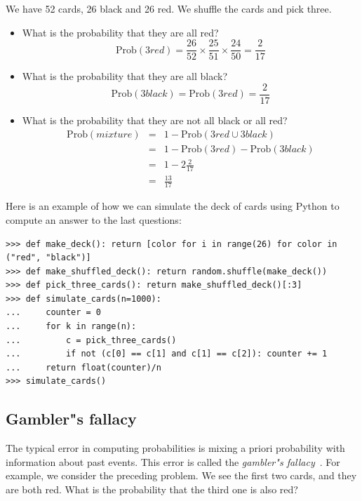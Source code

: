 \documentclass[justified, sixbynine]{tufte-book}
\def\ft{\small\tt}
\theoremstyle{plain}%
\newtheorem * {corollary}{Corollary}
\theoremstyle{definition}
\theoremstyle{remark}
\newtheorem * {remark}{Remark}
\newtheorem * {note}{Note}
\begin{document}
\begin{fullwidth}
We have 52 cards, 26 black and 26 red. We shuffle the cards and pick three.

\begin{itemize}
\item  What is the probability that they are all red?
\begin{equation}
\textrm{Prob}(3red)=\frac{26}{52}\times \frac{25}{51}\times \frac{24}{50}=\frac{2}{17}
\end{equation}

\item  What is the probability that they are all black?
\begin{equation}
\textrm{Prob}(3black)=\textrm{Prob}(3red)=\frac{2}{17}
\end{equation}

\item  What is the probability that they are not all black or all red?
\begin{eqnarray}
\textrm{Prob}(mixture) &=&1-\textrm{Prob}(3red\cup 3black) \\
&=&1-\textrm{Prob}(3red)-\textrm{Prob}(3black) \\
&=&1-2\frac{2}{17} \\
&=&\frac{13}{17}
\end{eqnarray}
\end{itemize}

Here is an example of how we can simulate the deck of cards using Python to compute an answer to the last questions:

\begin{lstlisting}[caption={in file: {\ft tests.py}}]
>>> def make_deck(): return [color for i in range(26) for color in ("red", "black")]
>>> def make_shuffled_deck(): return random.shuffle(make_deck())
>>> def pick_three_cards(): return make_shuffled_deck()[:3]
>>> def simulate_cards(n=1000):
...     counter = 0
...     for k in range(n):
...         c = pick_three_cards()
...         if not (c[0] == c[1] and c[1] == c[2]): counter += 1
...     return float(counter)/n
>>> simulate_cards()
\end{lstlisting}

\goodbreak\subsection{Gambler"s fallacy}

The typical error in computing probabilities is mixing a priori probability
with information about past events.
This error is called the {\it gambler"s fallacy}~\cite{gambler}.
For example, we consider the preceding problem. We see the first two cards, and they are both red. What is the
probability that the third one is also red?


\end{fullwidth}
\end{document}
